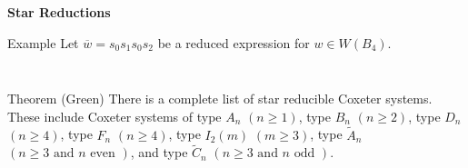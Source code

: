 \documentclass{beamer}
\newcommand{\w}{\overline{w}}
\newcommand\heapblock[4]{\fill[fill=#4, fill opacity=0.35, draw=#4, line width=1.1pt, rounded corners,shift={(\xxaxis:#1)},shift={(\yyaxis:#2)}] (-1,-1) rectangle (1,1);\node at (#1,#2) {\footnotesize $#3$};}
\newcommand\xxaxis{0}
\newcommand\yyaxis{90}
\begin{document}
\begin{frame}{\textbf{Star Reductions}}
\begin{block}{Example}
Let $\w=s_0s_1s_0s_2$ be a reduced expression for $w \in W(B_4)$.

\begin{columns}
\begin{column}{0.4\textwidth}
\begin{figure} \centering
{}
\end{figure}
\end{column}

\pause

\begin{column}{0.4\textwidth}
\begin{figure} \centering
{}
\end{figure}
\end{column}
\end{columns}
	
\end{block}

\pause

\begin{block}{Theorem (Green)}
	There is a complete list of star reducible Coxeter systems. These include Coxeter systems of type $A_n$ $(n \geq 1)$, type $B_n$ $(n \geq 2)$, type $D_n$ $(n \geq 4)$, type $F_n$ $(n \geq 4)$, type $I_2(m)$ $(m \geq 3)$, type $\widetilde{A}_{n}$ $(n \geq 3 \text{ and } n \text{ even })$, and type $\widetilde{C}_{n}$ $(n\geq 3 \text{ and } n \text{ odd })$.
\end{block}
	
\end{frame}

\end{document}
